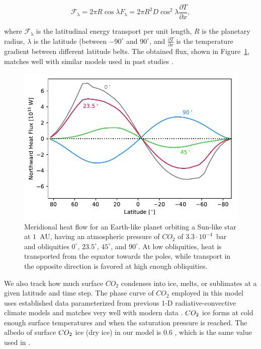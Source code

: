 \documentclass[fleqn,usenatbib]{mnras}
\begin{document}
\begin{equation}
    \mathcal{F}_{\mathrm{\lambda}}=2 \pi R \cos \lambda F_{\mathrm{\lambda}}=2 \pi R^{2} D \cos ^{2} \lambda \frac{\partial T}{\partial x},
\end{equation}

where $\mathcal{F}_{\mathrm{\lambda}}$ is the latitudinal energy transport per unit length, $R$ is the planetary radius, $\lambda$ is the latitude (between $-90^\circ$ and $90^\circ$, and $\frac{\partial T}{\partial x}$ is the temperature gradient between different latitude belts.
The obtained flux, shown in Figure~\ref{fig:flow}, matches well with similar models used in past studies \citep[e.g.,][]{WilliamsPollard}.

\begin{figure}
	\includegraphics[width=\columnwidth]{Figures/Meridional_flow.pdf}
    \caption{Meridional heat flow for an Earth-like planet  orbiting a Sun-like star at $1$~AU, having an atmospheric pressure of $CO_{\mathrm{2}}$ of $3.3\cdot10^{-4}$~bar and obliquities $0^\circ$, $23.5^\circ$, $45^\circ$, and $90^\circ$. At low obliquities, heat is transported from the equator towards the poles, while transport in the opposite direction is favored at high enough obliquities.}
    \label{fig:flow}
\end{figure}

We also track how much surface $CO_{\mathrm{2}}$  condenses into ice, melts, or sublimates at a given latitude and time step. The phase curve of $CO_{\mathrm{2}}$ employed in this model uses established data parameterized from previous 1-D radiative-convective climate models \citep{Kasting1991} and matches very well with modern data \citep{fray_sublimation_2009}. $CO_{\rm 2}$ ice forms at cold enough surface temperatures  and when the saturation pressure is reached.  The albedo of surface $CO_{\rm 2}$ ice (dry ice) in our model is 0.6 \citep{warren_spectral_1990}, which is the same value used in \citet{Turbet2017}.
\end{document}
